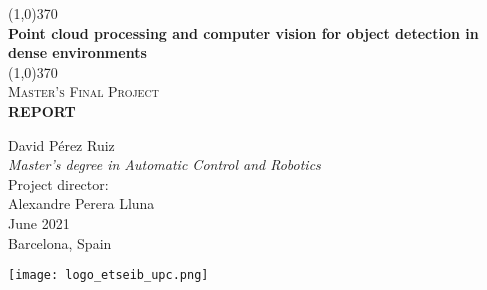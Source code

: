 \documentclass[../main.tex]{subfiles}
\begin{document}
\begin{titlepage}
    \begin{center}
        \vspace*{0cm}
        \line(1,0){370} \\
        [0.5cm]
        \huge{\bfseries Point cloud processing and computer vision for object detection in dense environments} \\
        \line(1,0){370} \\
        [1cm]
        \textsc{\Large Master's Final Project} \\
        [0.2cm]
        \Large \textbf{REPORT} \\
        [2.5cm]
    \end{center}
    \begin{center}
        \textup{\Large David Pérez Ruiz} \\
        [0.5cm]
        \textit{\large Master's degree in Automatic Control and Robotics} \\
        [0.8cm]
        \textup{\large Project director:} \\
        [0.5cm]
        \textup{\Large Alexandre Perera Lluna} \\
        [0.9cm]
        \textup{\large June 2021} \\
        [0.2cm]
        \textup{\large Barcelona, Spain} \\
        [1.8cm]
    \end{center}
    
    \begin{center}
        \texttt{[image: logo\_etseib\_upc.png]}
    \end{center}
\end{titlepage}
\end{document}
